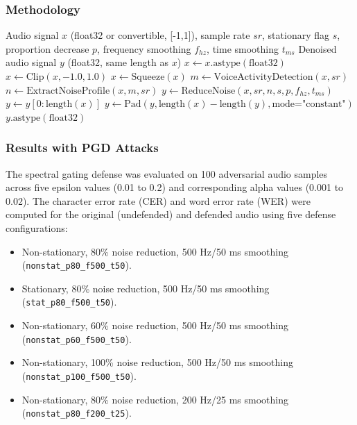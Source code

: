 \documentclass[a4paper,12pt]{article}
\begin{document}
\subsubsection{Methodology}

\begin{algorithm}
\caption{Spectral Gating Defense}
\label{alg:spectral_gating}
\begin{algorithmic}[1]
\Require Audio signal $x$ (float32 or convertible, [-1,1]), sample rate $sr$, stationary flag $s$, proportion decrease $p$, frequency smoothing $f_{hz}$, time smoothing $t_{ms}$
\Ensure Denoised audio signal $y$ (float32, same length as $x$)
\State $x \gets x.\text{astype}(\text{float32})$ 
\State $x \gets \text{Clip}(x, -1.0, 1.0)$ 
\State $x \gets \text{Squeeze}(x)$ 
\State $m \gets \text{VoiceActivityDetection}(x, sr)$ 
\State $n \gets \text{ExtractNoiseProfile}(x, m, sr)$ 
\State $y \gets \text{ReduceNoise}(x, sr, n, s, p, f_{hz}, t_{ms})$ 
    \State $y \gets y[0:\text{length}(x)]$ 
    \State $y \gets \text{Pad}(y, \text{length}(x) - \text{length}(y), \text{mode="constant"})$ 
\EndIf
\State \Return $y.\text{astype}(\text{float32})$
\end{algorithmic}
\end{algorithm}
\subsubsection{Results with PGD Attacks}

The spectral gating defense was evaluated on 100 adversarial audio samples across five epsilon values (0.01 to 0.2) and corresponding alpha values (0.001 to 0.02). The character error rate (CER) and word error rate (WER) were computed for the original (undefended) and defended audio using five defense configurations:
\begin{itemize}
    \item Non-stationary, 80\% noise reduction, 500 Hz/50 ms smoothing (\texttt{nonstat\_p80\_f500\_t50}).
    \item Stationary, 80\% noise reduction, 500 Hz/50 ms smoothing (\texttt{stat\_p80\_f500\_t50}).
    \item Non-stationary, 60\% noise reduction, 500 Hz/50 ms smoothing (\texttt{nonstat\_p60\_f500\_t50}).
    \item Non-stationary, 100\% noise reduction, 500 Hz/50 ms smoothing (\texttt{nonstat\_p100\_f500\_t50}).
    \item Non-stationary, 80\% noise reduction, 200 Hz/25 ms smoothing (\texttt{nonstat\_p80\_f200\_t25}).
\end{itemize}
\end{document}

